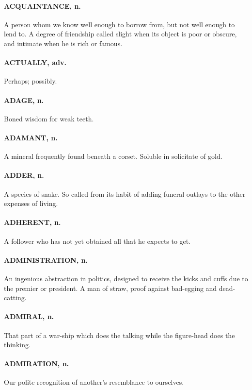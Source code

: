 \documentclass[11pt]{article}
\begin{document}
\paragraph{ACQUAINTANCE, n.}  A person whom we know well enough to borrow from,
but not well enough to lend to.  A degree of friendship called slight
when its object is poor or obscure, and intimate when he is rich or
famous.

\paragraph{ACTUALLY, adv.}  Perhaps; possibly.

\paragraph{ADAGE, n.}  Boned wisdom for weak teeth.

\paragraph{ADAMANT, n.}  A mineral frequently found beneath a corset.  Soluble in
solicitate of gold.

\paragraph{ADDER, n.}  A species of snake.  So called from its habit of adding
funeral outlays to the other expenses of living.

\paragraph{ADHERENT, n.}  A follower who has not yet obtained all that he expects
to get.

\paragraph{ADMINISTRATION, n.}  An ingenious abstraction in politics, designed to
receive the kicks and cuffs due to the premier or president.  A man of
straw, proof against bad-egging and dead-catting.

\paragraph{ADMIRAL, n.}  That part of a war-ship which does the talking while the
figure-head does the thinking.

\paragraph{ADMIRATION, n.}  Our polite recognition of another's resemblance to
ourselves.
\end{document}
